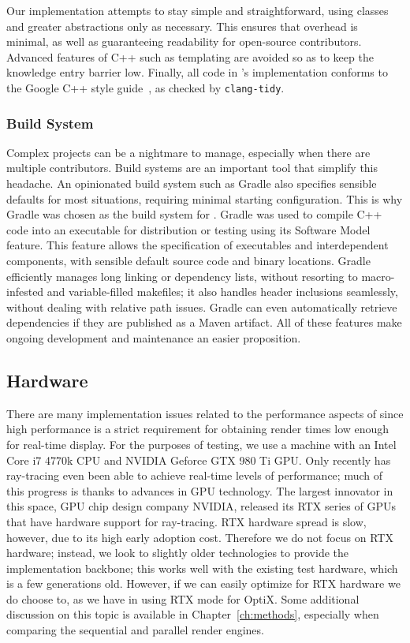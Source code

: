 Our implementation attempts to stay simple and straightforward, using classes and greater abstractions only as necessary.
This ensures that overhead is minimal, as well as guaranteeing readability for open-source contributors.
Advanced features of C++ such as templating are avoided so as to keep the knowledge entry barrier low.
Finally, all code in \name{}'s implementation conforms to the Google C++ style guide~\cite{googleStyleGuide}, as checked by \texttt{clang-tidy}.

\subsubsection{Build System}

Complex projects can be a nightmare to manage, especially when there are multiple contributors.
Build systems are an important tool that simplify this headache.
An opinionated build system such as Gradle also specifies sensible defaults for most situations, requiring minimal starting configuration.
This is why Gradle was chosen as the build system for \name{}.
Gradle was used to compile C++ code into an executable for distribution or testing using its Software Model feature.
This feature allows the specification of executables and interdependent components, with sensible default source code and binary locations.
Gradle efficiently manages long linking or dependency lists, without resorting to macro-infested and variable-filled makefiles; it also handles header inclusions seamlessly, without dealing with relative path issues.
Gradle can even automatically retrieve dependencies if they are published as a Maven artifact.
All of these features make ongoing development and maintenance an easier proposition.

\subsection{Hardware}
\label{ch:intro:background:hardware}

There are many implementation issues related to the performance aspects of \name{} since high performance is a strict requirement for obtaining render times low enough for real-time display.
For the purposes of testing, we use a machine with an Intel Core i7 4770k CPU and NVIDIA Geforce GTX 980 Ti GPU.
Only recently has ray-tracing even been able to achieve real-time levels of performance; much of this progress is thanks to advances in GPU technology.
The largest innovator in this space, GPU chip design company NVIDIA, released its RTX series of GPUs that have hardware support for ray-tracing.
RTX hardware spread is slow, however, due to its high early adoption cost.
Therefore we do not focus on RTX hardware; instead, we look to slightly older technologies to provide the implementation backbone; this works well with the existing test hardware, which is a few generations old.
However, if we can easily optimize for RTX hardware we do choose to, as we have in using RTX mode for OptiX.
Some additional discussion on this topic is available in Chapter~\ref{ch:methods}, especially when comparing the sequential and parallel render engines.

